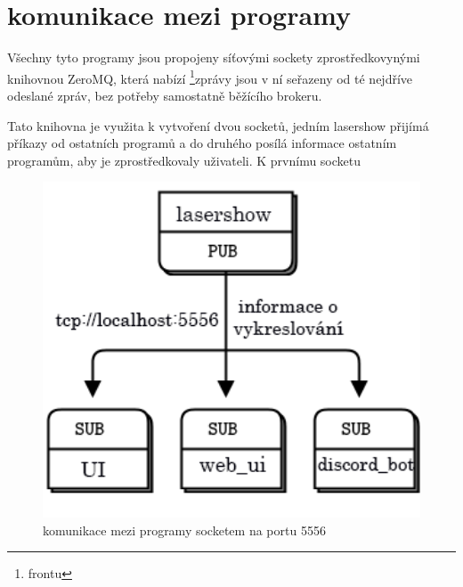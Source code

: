 \documentclass{template/socthesis}
\begin{document}
\section{komunikace mezi programy}
Všechny tyto programy jsou propojeny síťovými sockety zprostředkovynými knihovnou ZeroMQ, která nabízí \footnote{frontu}{zprávy jsou v ní seřazeny od té nejdříve odeslané} zpráv, bez potřeby samostatně běžícího brokeru.

Tato knihovna je využita k vytvoření dvou socketů, jedním lasershow přijímá příkazy od ostatních programů a do druhého posílá informace ostatním programům, aby je zprostředkovaly uživateli. K prvnímu socketu 

\begin{figure}[!htb]
  \centering
  \includegraphics[width=1\textwidth]{img/tcp5556.png}
  \caption{\label{fig:tcp5556}komunikace mezi programy socketem na portu 5556}
\end{figure}
\end{document}
